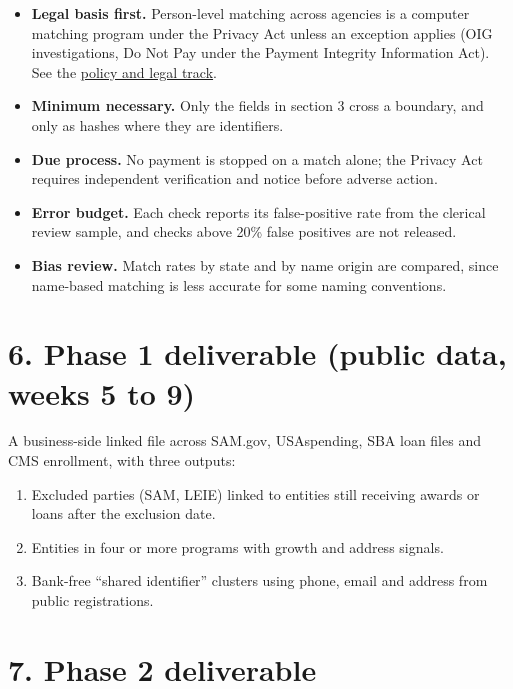 \documentclass[letterpaper,11pt]{article}
\providecommand{\tightlist}{\setlength{\itemsep}{0pt}\setlength{\parskip}{0pt}}
\begin{document}
\begin{itemize}
\tightlist
\item
  \textbf{Legal basis first.} Person-level matching across agencies is a
  computer matching program under the Privacy Act unless an exception
  applies (OIG investigations, Do Not Pay under the Payment Integrity
  Information Act). See the \href{../policy/legal_track.pdf}{policy and
  legal track}.
\item
  \textbf{Minimum necessary.} Only the fields in section 3 cross a
  boundary, and only as hashes where they are identifiers.
\item
  \textbf{Due process.} No payment is stopped on a match alone; the
  Privacy Act requires independent verification and notice before
  adverse action.
\item
  \textbf{Error budget.} Each check reports its false-positive rate from
  the clerical review sample, and checks above 20\% false positives are
  not released.
\item
  \textbf{Bias review.} Match rates by state and by name origin are
  compared, since name-based matching is less accurate for some naming
  conventions.
\end{itemize}

\hypertarget{phase-1-deliverable-public-data-weeks-5-to-9}{%
\section*{6. Phase 1 deliverable (public data, weeks 5 to
9)}\label{phase-1-deliverable-public-data-weeks-5-to-9}}

A business-side linked file across SAM.gov, USAspending, SBA loan files
and CMS enrollment, with three outputs:

\begin{enumerate}
\def\labelenumi{\arabic{enumi}.}
\tightlist
\item
  Excluded parties (SAM, LEIE) linked to entities still receiving awards
  or loans after the exclusion date.
\item
  Entities in four or more programs with growth and address signals.
\item
  Bank-free ``shared identifier'' clusters using phone, email and
  address from public registrations.
\end{enumerate}

\hypertarget{phase-2-deliverable}{%
\section*{7. Phase 2 deliverable}\label{phase-2-deliverable}}
\end{document}
